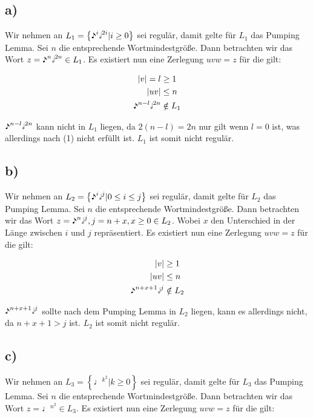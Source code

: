 \documentclass{article}
\begin{document}
\subsection*{a)}
Wir nehmen an $L_1=\left\{\eighthnote^i\halfnote^{2i} | i \geq 0\right\}$ sei regulär, damit gelte für $L_1$ das Pumping Lemma. Sei $n$ die entsprechende Wortmindestgröße. Dann betrachten wir das Wort $z=\eighthnote^n\halfnote^{2n} \in L_1$. Es existiert nun eine Zerlegung $uvw=z$ für die gilt:

\begin{align}
|v| = l &\geq 1\\
|uv| &\leq n\\
\eighthnote^{n-l}\halfnote^{2n} &\notin L_1
\end{align}

$\eighthnote^{n-l}\halfnote^{2n}$ kann nicht in $L_1$ liegen, da $2(n-l) = 2n$ nur gilt wenn $l=0$ ist, was allerdings nach (1) nicht erfüllt ist. $L_1$ ist somit nicht regulär.
\setcounter{equation}{0}


\subsection*{b)}
Wir nehmen an $L_2=\left\{\eighthnote^i\halfnote^j | 0\leq i \leq j\right\}$ sei regulär, damit gelte für $L_2$ das Pumping Lemma. Sei $n$ die entsprechende Wortmindestgröße. Dann betrachten wir das Wort $z=\eighthnote^n\halfnote^j, j = n + x, x \geq 0 \in L_2$. Wobei $x$ den Unterschied in der Länge zwischen $i$ und $j$ repräsentiert. Es existiert nun eine Zerlegung $uvw=z$ für die gilt:

\begin{align}
|v| &\geq 1\\
|uv| &\leq n\\
\eighthnote^{n+x+1}\halfnote^{j} &\notin L_2
\end{align}

$\eighthnote^{n+x+1}\halfnote^{j}$ sollte nach dem Pumping Lemma in $L_2$ liegen, kann es allerdings nicht, da $n+x+1 > j $ ist. $L_2$ ist somit nicht regulär.
\setcounter{equation}{0}


\subsection*{c)}
Wir nehmen an $L_3=\left\{\quarternote^{k^2}| k\geq0 \right\}$ sei regulär, damit gelte für $L_3$ das Pumping Lemma. Sei $n$ die entsprechende Wortmindestgröße. Dann betrachten wir das Wort $z=\quarternote^{n^2} \in L_3$. Es existiert nun eine Zerlegung $uvw=z$ für die gilt:
\end{document}
